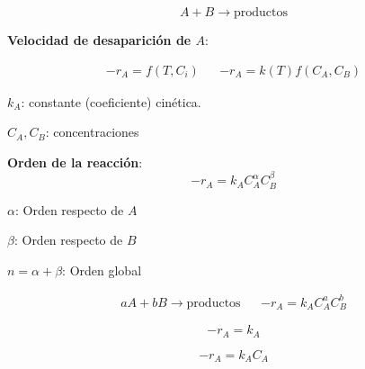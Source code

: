         \[A + B \rightarrow \text{productos}\]
        
        \textbf{Velocidad de desaparición de \(A\)}:
        
        \[
        \begin{matrix}
            -r_{A} = f \left ( T, C_{i} \right ) & & - r_{A} = k(T)f \left ( C_{A}, C_{B} \right )
        \end{matrix}
        \]
        
        \begin{multicols}{2}
            \(k_{A}\): constante (coeficiente) cinética.
        
            \(C_{A}, C_{B}\): concentraciones
        \end{multicols}
        
        \textbf{Orden de la reacción}:
        \[-r_{A} = k_{A} C_{A}^{\alpha} C_{B}^{\beta}\]
        
        \begin{multicols}{3}
            \(\alpha\): Orden respecto de \(A\)
        
            \(\beta\): Orden respecto de \(B\)
            
            \(n = \alpha + \beta\): Orden global
        \end{multicols}
        
        \begin{quote}
            \textit{}
        \end{quote}
        
        \begin{quote}
            \textit{}
        \end{quote}
        
        \[
        \begin{matrix}
            aA + bB \rightarrow \text{productos} & & -r_{A} = k_{A}C_{A}^{a}C_{B}^{b}
        \end{matrix}
        \]
        
            \begin{multicols}{2}
            
                \begin{equation}
                \label{eq:orden_cero}
                    -r_{A} = k_{A}
                \end{equation}
                
                
                \begin{equation}
                \label{eq:primer_orden}
                    -r_{A} = k_{A}C_{A}
                \end{equation}
            \end{multicols}
            
